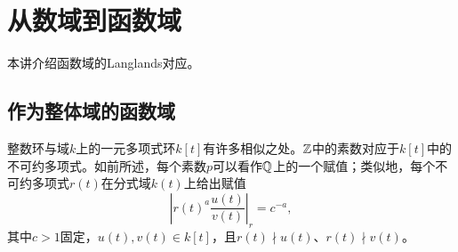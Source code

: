 ﻿\chapter{从数域到函数域}\label{L9}
本讲介绍函数域的Langlands对应。
\section{作为整体域的函数域}\label{L9S1}
整数环与域$k$上的一元多项式环$k[t]$有许多相似之处。$\mathbb{Z}$中的素数对应于$k[t]$中的不可约多项式。如前所述，每个素数$p$可以看作$\mathbb{Q}$上的一个赋值；类似地，每个不可约多项式$r(t)$在分式域$k(t)$上给出赋值
\begin{equation}\tag{1.1}\label{L9eq11}
\left|r(t)^a\frac{u(t)}{v(t)}\right|_r=c^{-a},
\end{equation}
其中$c>1$固定，$u(t),v(t)\in k[t]$，且$r(t)\nmid u(t)$、$r(t)\nmid v(t)$。

